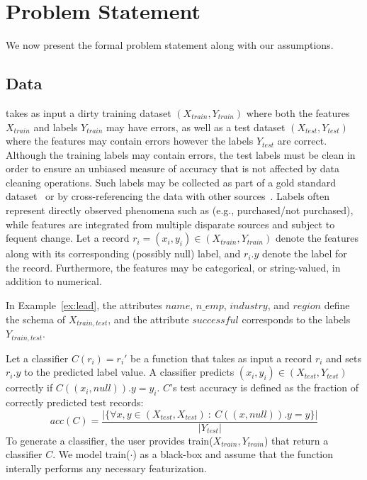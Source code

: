 \section{Problem Statement}
We now present the formal problem statement along with our assumptions.

\subsection{Data}
\sys takes as input a dirty training dataset $(X_{train}, Y_{train})$ where both the features $X_{train}$ and labels $Y_{train}$ may have errors, as well as a test dataset $(X_{test}, Y_{test})$ where the features may contain errors however the labels $Y_{test}$ are correct.  Although the training labels may contain errors, the test labels must be clean in order to ensure an unbiased measure of accuracy that is not affected by data cleaning operations.  Such labels may be collected as part of a gold standard dataset~\cite{marcus2015crowdsourced} or by cross-referencing the data with other sources~\cite{li2012truth}.  
Labels often represent directly observed phenomena such as (e.g., purchased/not purchased), while features are integrated from multiple disparate sources and subject to fequent change.
Let a record $r_i = (x_i,y_i) \in (X_{train},Y_{train})$ denote the features along with its corresponding (possibly null) label, and $r_i.y$ denote the label for the record.    Furthermore, the features may be categorical, or string-valued, in addition to numerical.

\begin{example}[Notation]
In Example~\ref{ex:lead}, the attributes $name$, $n\_emp$, $industry$, and $region$ define the schema of $X_{train,test}$, and the attribute $successful$ corresponds to the labels $Y_{train,test}$.
\end{example}

Let a classifier $C(r_i) = r_i'$ be a function that takes as input a record $r_i$ and sets $r_i.y$ to the predicted label value.
A classifier predicts $(x_i, y_i) \in (X_{test}, Y_{test})$ correctly if  $C((x_i, null)).y = y_i$.  $C$'s test accuracy is defined as the fraction of correctly predicted test records:
\[
acc(C) = \frac{|\{\forall x,y \in (X_{test}, X_{test})~:~ C((x, null)).y = y\}|}{|Y_{test}|}
\]
To generate a classifier, the user provides \textsf{train}($X_{train}, Y_{train}$) that return a classifier $C$. We model \textsf{train}($\cdot$) as a black-box and assume that the function interally performs any necessary featurization.

